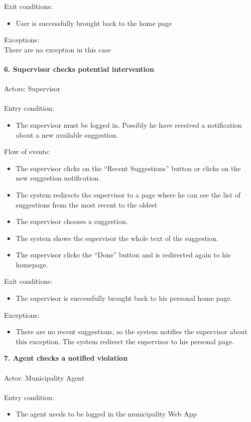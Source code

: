 \documentclass[a4paper]{report}
\begin{document}
Exit conditions:
\begin{itemize}
\item User is successfully brought back to the home page
\end{itemize}
Exceptions: \\There are no exception in this case
\\ \\
\textbf{6. Supervisor checks potential intervention}\label{uc:6}
\\ \\
Actors: Supervisor \\ \\
Entry condition: 
\begin{itemize}
\item The supervisor must be logged in. Possibly he have received a notification about a new available suggestion. 
\end{itemize}
Flow of events:
\begin{itemize}
\item The supervisor clicks on the “Recent Suggestions” button or clicks on the new suggestion notification.
\item The system redirects the supervisor to a page where he can see the list of suggestions from the most recent to the oldest
\item The supervisor chooses a suggestion.
\item The system shows the supervisor the whole text of the suggestion.
\item The supervisor clicks the “Done” button and is redirected again to his homepage.
\end{itemize}
Exit conditions:
\begin{itemize}
\item The supervisor is successfully brought back to his personal home page.
\end{itemize}
Exceptions:
\begin{itemize}
\item There are no recent suggestions, so the system notifies the supervisor about this exception. The system redirect the supervisor to his personal page.
\end{itemize}
\textbf{7. Agent checks a notified violation}\label{uc:7}
\\ \\
Actor: Municipality Agent \\ \\
Entry condition: 	
\begin{itemize}
\item The agent needs to be logged in the municipality Web App
\end{itemize}
\end{document}

